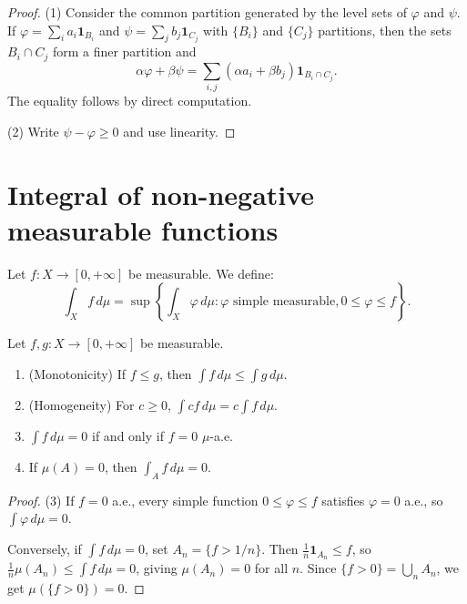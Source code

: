 \begin{proof}
(1) Consider the common partition generated by the level sets of $\varphi$ and
$\psi$. If $\varphi = \sum_i a_i \mathbf{1}_{B_i}$ and $\psi = \sum_j b_j
\mathbf{1}_{C_j}$ with $\{B_i\}$ and $\{C_j\}$ partitions, then the sets
$B_i \cap C_j$ form a finer partition and
\[
\alpha\varphi + \beta\psi = \sum_{i,j} (\alpha a_i + \beta b_j)
\mathbf{1}_{B_i \cap C_j}.
\]
The equality follows by direct computation.

(2) Write $\psi - \varphi \geq 0$ and use linearity.
\end{proof}

\section{Integral of non-negative measurable functions}

\begin{definition}
Let $f : X \to [0, +\infty]$ be measurable. We define:
\[
\int_X f\, d\mu = \sup\left\{\int_X \varphi\, d\mu :
\varphi \text{ simple measurable}, 0 \leq \varphi \leq f\right\}.
\]
\end{definition}

\begin{proposition}
Let $f, g : X \to [0, +\infty]$ be measurable.
\begin{enumerate}
    \item (Monotonicity) If $f \leq g$, then $\int f\, d\mu \leq \int g\, d\mu$.
    \item (Homogeneity) For $c \geq 0$, $\int cf\, d\mu = c \int f\, d\mu$.
    \item $\int f\, d\mu = 0$ if and only if $f = 0$ $\mu$-a.e.
    \item If $\mu(A) = 0$, then $\int_A f\, d\mu = 0$.
\end{enumerate}
\end{proposition}

\begin{proof}
(3) If $f = 0$ a.e., every simple function $0 \leq \varphi \leq f$ satisfies
$\varphi = 0$ a.e., so $\int \varphi\, d\mu = 0$.

Conversely, if $\int f\, d\mu = 0$, set $A_n = \{f > 1/n\}$. Then
$\frac{1}{n} \mathbf{1}_{A_n} \leq f$, so
$\frac{1}{n} \mu(A_n) \leq \int f\, d\mu = 0$, giving $\mu(A_n) = 0$ for all $n$.
Since $\{f > 0\} = \bigcup_n A_n$, we get $\mu(\{f > 0\}) = 0$.
\end{proof}

